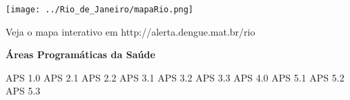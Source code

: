 \documentclass[10pt]{article} %
\begin{document}
 \begin{minipage}[t]{0.6\linewidth} %
\hypertarget{mun}{} %


\texttt{[image: ../Rio\_de\_Janeiro/mapaRio.png]}

\small{Veja o mapa interativo em http://alerta.dengue.mat.br/rio}

\vspace{2cm}

\begin{center}

\end{center}

\BackToContents %
\end{minipage}
\begin{minipage}[t]{.26\linewidth} 
\begin{mdframed}[style=sidebar,frametitle={}] 


\textbf{Áreas Programáticas da Saúde} 

\begin{itemize}\gsquare APS  1.0 
\gsquare APS  2.1 
\gsquare APS  2.2 
\gsquare APS  3.1 
\gsquare APS  3.2 
\gsquare APS  3.3 
\gsquare APS  4.0 
\gsquare APS  5.1 
\gsquare APS  5.2 
\gsquare APS  5.3 \end{itemize}
\end{mdframed} 
\end{minipage}
\newpage


\hypertarget{municipio}{} %
\end{document}
